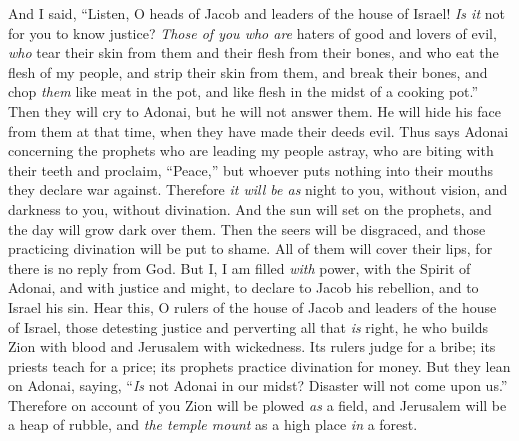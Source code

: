 \begin{biblechapter} %
 And I said, 
“Listen, O heads of Jacob 
and leaders of the house of Israel! 
\textit{Is it} not for you to know justice?
\verse \textit{Those of you who are} haters of good 
and lovers of evil, 
\textit{who} tear their skin from them 
and their flesh from their bones,
\verse and who eat the flesh of my people, 
and strip their skin from them, 
and break their bones, 
and chop \textit{them} like meat in the pot, 
and like flesh in the midst of a cooking pot.”
\verse Then they will cry to Adonai, 
but he will not answer them. 
He will hide his face from them at that time, 
when they have made their deeds evil.
\verse Thus says Adonai concerning the prophets 
who are leading my people astray, 
who are biting with their teeth 
and proclaim, “Peace,” 
but whoever puts nothing into their mouths 
they declare war against.
\verse Therefore \textit{it will be as} night to you, without vision, 
and darkness to you, without divination. 
And the sun will set on the prophets, 
and the day will grow dark over them.
\verse Then the seers will be disgraced, 
and those practicing divination will be put to shame. 
All of them will cover their lips, 
for there is no reply from God.
\verse But I, I am filled \textit{with} power, 
with the Spirit of Adonai, 
and with justice and might, 
to declare to Jacob his rebellion, 
and to Israel his sin.
\verse Hear this, O rulers of the house of Jacob 
and leaders of the house of Israel, 
those detesting justice 
and perverting all that \textit{is} right,
\verse he who builds Zion with blood 
and Jerusalem with wickedness.
\verse Its rulers judge for a bribe; 
its priests teach for a price; 
its prophets practice divination for money. 
But they lean on Adonai, saying, 
“\textit{Is} not Adonai in our midst? 
Disaster will not come upon us.”
\verse Therefore on account of you 
Zion will be plowed \textit{as} a field, 
and Jerusalem will be a heap of rubble, 
and \textit{the temple mount} as a high place \textit{in} a forest.
\end{biblechapter}

